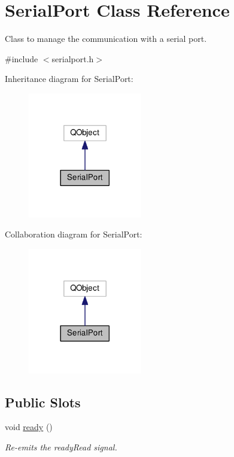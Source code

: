 \hypertarget{class_serial_port}{\section{Serial\-Port Class Reference}
\label{class_serial_port}
}


Class to manage the communication with a serial port.  




{\ttfamily \#include $<$serialport.\-h$>$}



Inheritance diagram for Serial\-Port\-:\nopagebreak
\begin{figure}[H]
\begin{center}
\leavevmode
\includegraphics[width=141pt]{class_serial_port__inherit__graph}
\end{center}
\end{figure}


Collaboration diagram for Serial\-Port\-:\nopagebreak
\begin{figure}[H]
\begin{center}
\leavevmode
\includegraphics[width=141pt]{class_serial_port__coll__graph}
\end{center}
\end{figure}
\subsection*{Public Slots}
\begin{DoxyCompactItemize}
\item 
void \hyperlink{class_serial_port_a76a7bb63e3f581ccb55a5951bf97a4e3}{ready} ()
\begin{DoxyCompactList}\small\item\em Re-\/emits the ready\-Read signal. \end{DoxyCompactList}\end{DoxyCompactItemize}
